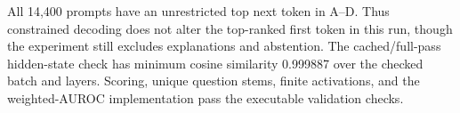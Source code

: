All 14,400 prompts have an unrestricted top next token in A--D. Thus constrained decoding does not alter the top-ranked first token in this run, though the experiment still excludes explanations and abstention. The cached/full-pass hidden-state check has minimum cosine similarity 0.999887 over the checked batch and layers. Scoring, unique question stems, finite activations, and the weighted-AUROC implementation pass the executable validation checks.
